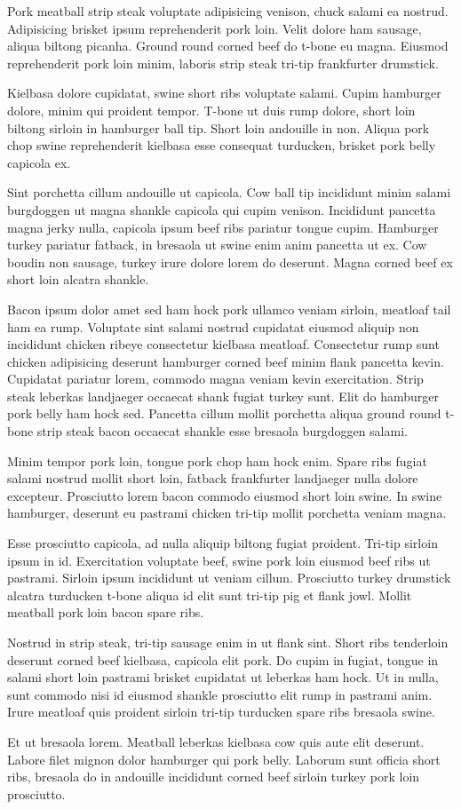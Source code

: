 \documentclass{article}
\begin{document}
 Pork meatball strip steak voluptate adipisicing venison, chuck salami ea nostrud. Adipisicing brisket ipsum reprehenderit pork loin. Velit dolore ham sausage, aliqua biltong picanha. Ground round corned beef do t-bone eu magna. Eiusmod reprehenderit pork loin minim, laboris strip steak tri-tip frankfurter drumstick.

 Kielbasa dolore cupidatat, swine short ribs voluptate salami. Cupim hamburger dolore, minim qui proident tempor. T-bone ut duis rump dolore, short loin biltong sirloin in hamburger ball tip. Short loin andouille in non. Aliqua pork chop swine reprehenderit kielbasa esse consequat turducken, brisket pork belly capicola ex.

 Sint porchetta cillum andouille ut capicola. Cow ball tip incididunt minim salami burgdoggen ut magna shankle capicola qui cupim venison. Incididunt pancetta magna jerky nulla, capicola ipsum beef ribs pariatur tongue cupim. Hamburger turkey pariatur fatback, in bresaola ut swine enim anim pancetta ut ex. Cow boudin non sausage, turkey irure dolore lorem do deserunt. Magna corned beef ex short loin alcatra shankle.

Bacon ipsum dolor amet sed ham hock pork ullamco veniam sirloin, meatloaf tail ham ea rump. Voluptate sint salami nostrud cupidatat eiusmod aliquip non incididunt chicken ribeye consectetur kielbasa meatloaf. Consectetur rump sunt chicken adipisicing deserunt hamburger corned beef minim flank pancetta kevin. Cupidatat pariatur lorem, commodo magna veniam kevin exercitation. Strip steak leberkas landjaeger occaecat shank fugiat turkey sunt. Elit do hamburger pork belly ham hock sed. Pancetta cillum mollit porchetta aliqua ground round t-bone strip steak bacon occaecat shankle esse bresaola burgdoggen salami.

Minim tempor pork loin, tongue pork chop ham hock enim. Spare ribs fugiat salami nostrud mollit short loin, fatback frankfurter landjaeger nulla dolore excepteur. Prosciutto lorem bacon commodo eiusmod short loin swine. In swine hamburger, deserunt eu pastrami chicken tri-tip mollit porchetta veniam magna.

Esse prosciutto capicola, ad nulla aliquip biltong fugiat proident. Tri-tip sirloin ipsum in id. Exercitation voluptate beef, swine pork loin eiusmod beef ribs ut pastrami. Sirloin ipsum incididunt ut veniam cillum. Prosciutto turkey drumstick alcatra turducken t-bone aliqua id elit sunt tri-tip pig et flank jowl. Mollit meatball pork loin bacon spare ribs.

Nostrud in strip steak, tri-tip sausage enim in ut flank sint. Short ribs tenderloin deserunt corned beef kielbasa, capicola elit pork. Do cupim in fugiat, tongue in salami short loin pastrami brisket cupidatat ut leberkas ham hock. Ut in nulla, sunt commodo nisi id eiusmod shankle prosciutto elit rump in pastrami anim. Irure meatloaf quis proident sirloin tri-tip turducken spare ribs bresaola swine.

Et ut bresaola lorem. Meatball leberkas kielbasa cow quis aute elit deserunt. Labore filet mignon dolor hamburger qui pork belly. Laborum sunt officia short ribs, bresaola do in andouille incididunt corned beef sirloin turkey pork loin prosciutto.
\end{document}
